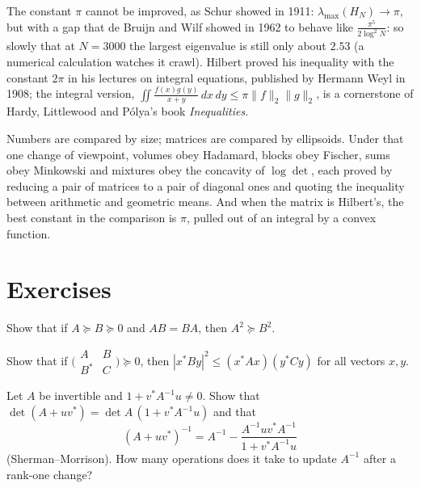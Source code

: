 The constant $\pi$ cannot be improved, as Schur showed in 1911: $\lambda_{\max}(H_N)\to\pi$, but with a gap that de Bruijn and Wilf
showed in 1962 to behave like $\frac{\pi^5}{2\log^2N}$: so slowly that at $N=3000$ the largest eigenvalue is still only about $2.53$
(a numerical calculation watches it crawl). Hilbert proved his inequality with the
constant $2\pi$ in his lectures on integral equations, published by Hermann Weyl in 1908; the integral version,
$\iint\frac{f(x)g(y)}{x+y}\,dx\,dy\le\pi\|f\|_2\|g\|_2$, is a cornerstone of Hardy, Littlewood and P\'olya's book \emph{Inequalities}.

\begin{beauty}
Numbers are compared by size; matrices are compared by ellipsoids. Under that one change of viewpoint, volumes obey Hadamard,
blocks obey Fischer, sums obey Minkowski and mixtures obey the concavity of $\log\det$, each proved by reducing a pair of matrices to a
pair of diagonal ones and quoting the inequality between arithmetic and geometric means. And when the matrix is Hilbert's, the
best constant in the comparison is $\pi$, pulled out of an integral by a convex function.
\end{beauty}

\section{Exercises}

\begin{exercise}[$\star$]\label{linear:ex:commutingsquare}
Show that if $A\succeq B\succeq0$ and $AB=BA$, then $A^2\succeq B^2$.
\end{exercise}

\begin{exercise}[$\star$]\label{linear:ex:blockcs}
Show that if $\bigl(\begin{smallmatrix}A&B\\B^*&C\end{smallmatrix}\bigr)\succeq0$, then $|x^*By|^2\le(x^*Ax)(y^*Cy)$ for all vectors $x,y$.
\end{exercise}

\begin{exercise}[$\star\star$]\label{linear:ex:sherman}
Let $A$ be invertible and $1+v^*A^{-1}u\ne0$. Show that $\det(A+uv^*)=\det A\,(1+v^*A^{-1}u)$ and that
\[
(A+uv^*)^{-1}=A^{-1}-\frac{A^{-1}uv^*A^{-1}}{1+v^*A^{-1}u}
\]
(Sherman--Morrison). How many operations does it take to update $A^{-1}$ after a rank-one change?
\end{exercise}

